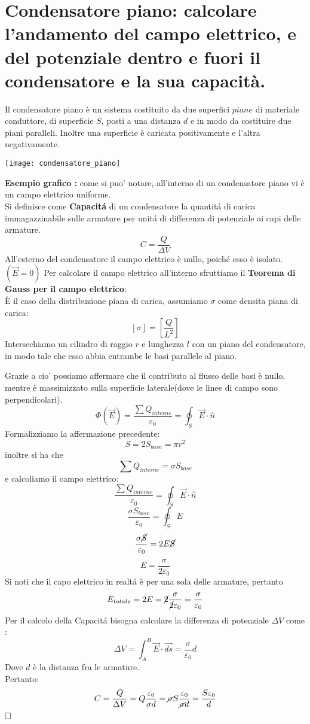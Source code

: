 \section{Condensatore piano: calcolare l'andamento del campo
	elettrico, e del potenziale dentro e fuori il condensatore e la
	sua capacità.}
Il condensatore piano \`e un sistema costituito da due superfici $piane$ di materiale conduttore, di superficie $S$, posti a una distanza $d$ e in modo da costituire due piani paralleli. Inoltre una superficie \`e caricata positivamente e l'altra negativamente.\\
\begin{center}
	\texttt{[image: condensatore\_piano]}
\end{center}
\textbf{Esempio grafico :} come si puo' notare, all'interno di un condensatore piano vi \`e un campo elettrico uniforme.\\
Si definisce come \textbf{Capacit\'a} di un condensatore la quantit\'a di carica immagazzinabile sulle armature per unit\'a di differenza di potenziale ai capi delle armature.\\
$$
    C = \frac{Q}{\Delta V}
$$
All'esterno del condensatore il campo elettrico \`e nullo, poich\'e esso \`e isolato. $\left(\vec{E} = 0\right)$
Per calcolare il campo elettrico all'interno sfruttiamo il \textbf{Teorema di Gauss per il campo elettrico}: \\
\`E il caso della distribuzione piana di carica, assumiamo $\sigma$ come densita piana di carica:
$$
   \left[\sigma\right] = \left[\frac{Q}{L^2}\right]
$$
Intersechiamo un cilindro di raggio $r$ e lunghezza $l$ con un piano del condensatore, in modo tale che esso abbia entrambe le basi parallele al piano.

\pagebreak

Grazie a cio' possiamo affermare che il contributo al flusso delle basi \`e nullo, mentre \`e massimizzato sulla superficie laterale(dove le linee di campo sono perpendicolari).\\
$$
    \Phi(\vec{E}) = \frac{\sum{Q_{interne}}}{\varepsilon_0} = \oint_S{\vec{E} \cdot \hat{n}}
$$
Formalizziamo la affermazione precedente:
$$
    S = 2 S_{base} = \pi r^2
$$
inoltre si ha che
$$
    \sum{Q_{interne}} = \sigma S_{base}
$$
e calcoliamo il campo elettrico:
$$
    \frac{\sum{Q_{interne}}}{\varepsilon_0} = \oint_S{\vec{E} \cdot \hat{n}}
$$
$$
    \frac{\sigma S_{base}}{\varepsilon_0} = \oint_S{E}
$$
$$
    \frac{\sigma \cancel{S}}{\varepsilon_0} = 2 E \cancel{S}
$$
$$
    E = \frac{\sigma}{2 \varepsilon_0}
$$
Si noti che il capo elettrico in realt\'a \`e per una sola delle armature, pertanto 
$$
    E_{totale} = 2 E = \cancel{2} \frac{\sigma}{\cancel{2} \varepsilon_0} = \frac{\sigma}{\varepsilon_0}
$$
Per il calcolo della Capacit\'a bisogna calcolare la differenza di potenziale $\Delta V$ come :
$$
    \Delta V = \int_{A}^{B}{\vec{E} \cdot \vec{ds}} = \frac{\sigma}{\varepsilon_0}d
$$
Dove $d$ \`e la distanza fra le armature.\\
Pertanto:
$$
    C = \frac{Q}{\Delta V} = Q \frac{\varepsilon_0}{\sigma d} = 
    \cancel{\sigma} S \frac{\varepsilon_0}{\cancel{\sigma} d} = \frac{S\varepsilon_0}{d}
$$
$\hfill\square$